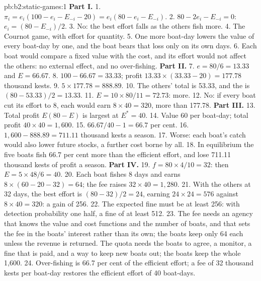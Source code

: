 \begin{solution}{pb:b2:static-games:1}
\textbf{Part I.}
1. $\pi_i = e_i(100 - e_i - E_{-i} - 20) = e_i(80 - e_i - E_{-i})$.
2. $80 - 2e_i - E_{-i} = 0$: $e_i = (80 - E_{-i})/2$.
3. No: the best effort falls as the others fish more.
4. The Cournot game, with effort for quantity.
5. One more boat-day lowers the value of every boat-day by one, and the boat bears that loss only on its own days.
6. Each boat would compare a fixed value with the cost, and its effort would not affect the others: no external
effect, and no over-fishing.
\textbf{Part II.}
7. $e = 80/6 = 13.33$ and $E = 66.67$.
8. $100 - 66.67 = 33.33$; profit $13.33 \times (33.33 - 20) = 177.78$ thousand kests.
9. $5 \times 177.78 = 888.89$.
10. The others' total is 53.33, and the  is $(80 - 53.33)/2 = 13.33$.
11. $E = 10 \times 80/11 = 72.73$: more.
12. No: if every boat cut its effort to 8, each would earn $8 \times 40 = 320$, more than 177.78.
\textbf{Part III.}
13. Total profit $E(80 - E)$ is largest at $E^* = 40$.
14. Value 60 per boat-day; total profit $40 \times 40 = 1{,}600$.
15. $66.67/40 - 1 = 66.7$ per cent.
16. $1{,}600 - 888.89 = 711.11$ thousand kests a season.
17. Worse: each boat's catch would also lower future stocks, a further cost borne by all.
18. In equilibrium the five boats fish 66.7 per cent more than the efficient effort, and lose 711.11 thousand kests of
profit a season.
\textbf{Part IV.}
19. $f = 80 \times 4/10 = 32$: then $E = 5 \times 48/6 = 40$.
20. Each boat fishes 8 days and earns $8 \times (60 - 20 - 32) = 64$; the fee raises $32 \times 40 = 1{,}280$.
21. With the others at 32 days, the best effort is $(80 - 32)/2 = 24$, earning $24 \times 24 = 576$ against $8 \times 40 = 320$: a
gain of 256.
22. The expected fine must be at least 256: with detection probability one half, a fine of at least 512.
23. The fee needs an agency that knows the value and cost functions and the number of boats, and that sets the
fee in the boats' interest rather than its own; the boats keep only 64 each unless the revenue is returned.
The quota needs the boats to agree, a monitor, a fine that is paid, and a way to keep new boats out; the boats
keep the whole 1{,}600.
24. Over-fishing is 66.7 per cent of the efficient effort; a fee of 32 thousand kests per boat-day restores the
efficient effort of 40 boat-days.
\end{solution}
